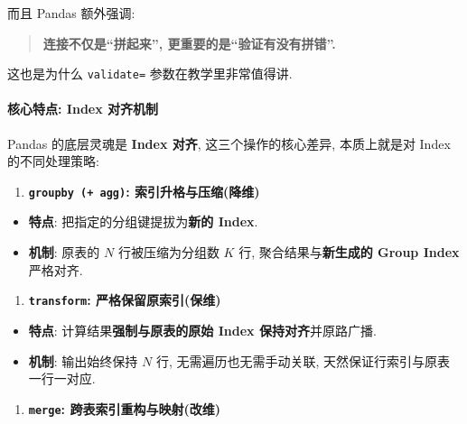 \documentclass[11pt]{article}
\providecommand{\tightlist}{%
      \setlength{\itemsep}{0pt}\setlength{\parskip}{0pt}}
\begin{document}
而且 Pandas 额外强调:

\begin{quote}
\textbf{连接不仅是``拼起来'', 更重要的是``验证有没有拼错''.}
\end{quote}

这也是为什么 \texttt{validate=} 参数在教学里非常值得讲.

    \paragraph{核心特点: Index
对齐机制}\label{ux6838ux5fc3ux7279ux70b9-index-ux5bf9ux9f50ux673aux5236}

    Pandas 的底层灵魂是 \textbf{Index 对齐}, 这三个操作的核心差异,
本质上就是对 Index 的不同处理策略:

\begin{enumerate}
\def\labelenumi{\arabic{enumi}.}
\tightlist
\item
  \textbf{\texttt{groupby\ (+\ agg)}: 索引升格与压缩(降维)}
\end{enumerate}

\begin{itemize}
\tightlist
\item
  \textbf{特点}: 把指定的分组键提拔为\textbf{新的 Index}.
\item
  \textbf{机制}: 原表的 \(N\) 行被压缩为分组数 \(K\) 行,
  聚合结果与\textbf{新生成的 Group Index} 严格对齐.
\end{itemize}

\begin{enumerate}
\def\labelenumi{\arabic{enumi}.}
\setcounter{enumi}{1}
\tightlist
\item
  \textbf{\texttt{transform}: 严格保留原索引(保维)}
\end{enumerate}

\begin{itemize}
\tightlist
\item
  \textbf{特点}: 计算结果\textbf{强制与原表的原始 Index
  保持对齐}并原路广播.
\item
  \textbf{机制}: 输出始终保持 \(N\) 行, 无需遍历也无需手动关联,
  天然保证行索引与原表一行一对应.
\end{itemize}

\begin{enumerate}
\def\labelenumi{\arabic{enumi}.}
\setcounter{enumi}{2}
\tightlist
\item
  \textbf{\texttt{merge}: 跨表索引重构与映射(改维)}
\end{enumerate}
\end{document}
